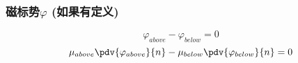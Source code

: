 
\subsubsection{磁标势$\varphi$ (如果有定义)}
\begin{equation}
\varphi_{above}-\varphi_{below}=0
\end{equation}
\begin{equation}
\mu_{above}\pdv{\varphi_{above}}{n} - \mu_{below}\pdv{\varphi_{below}}{n}  = 0
\end{equation}
